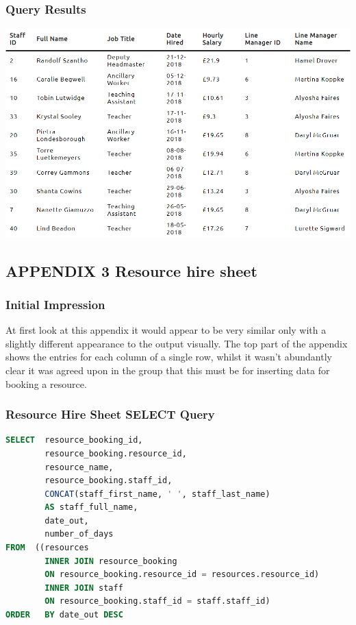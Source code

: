 \documentclass{article}
\begin{document}
\subsubsection{Query Results}
\includegraphics[width=\linewidth]{images/02.png}

\subsection{APPENDIX 3 Resource hire sheet}
\subsubsection{Initial Impression} At first look at this appendix it would appear to be very similar only with a slightly different appearance to the output visually. The top part of the appendix shows the entries for each column of a single row, whilst it wasn't abundantly clear it was agreed upon in the group that this must be for inserting data for booking a resource.

\subsubsection{Resource Hire Sheet SELECT Query}
\begin{lstlisting}[language=sql, caption=Resource Hire Sheet SELECT Query, style=mystyle]
SELECT  resource_booking_id, 
        resource_booking.resource_id, 
        resource_name, 
        resource_booking.staff_id, 
        CONCAT(staff_first_name, ' ', staff_last_name) 
        AS staff_full_name, 
        date_out, 
        number_of_days 
FROM  ((resources
        INNER JOIN resource_booking 
        ON resource_booking.resource_id = resources.resource_id)
        INNER JOIN staff
        ON resource_booking.staff_id = staff.staff_id)
ORDER   BY date_out DESC
\end{lstlisting}
\end{document}
